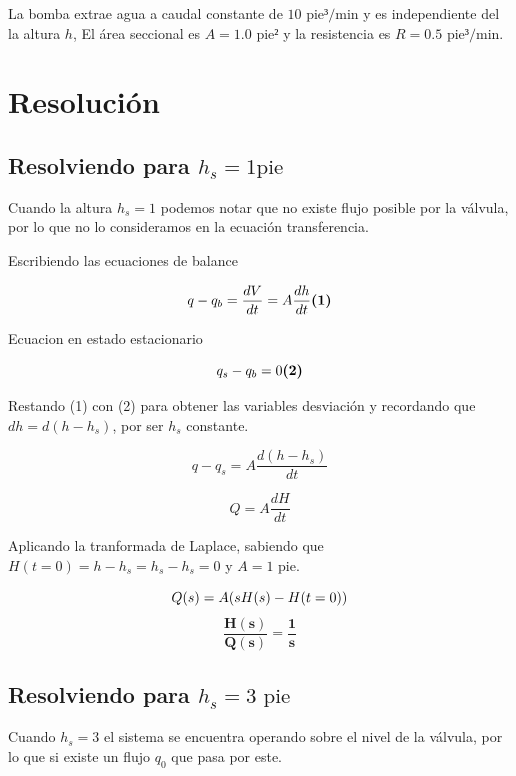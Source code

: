 \documentclass[
  letterpaper,
  DIV=11,
  numbers=noendperiod]{scrreprt}
\begin{document}
La bomba extrae agua a caudal constante de \(10\text{ pie³/min}\) y es
independiente del la altura \(h\), El área seccional es
\(A = 1.0\text{ pie²}\) y la resistencia es \(R=0.5\text{ pie³/min}\).

\hypertarget{resoluciuxf3n-1}{%
\section{Resolución}\label{resoluciuxf3n-1}}

\hypertarget{resolviendo-para-h_s1textpie}{%
\subsection{\texorpdfstring{Resolviendo para
\(h_s=1\text{pie}\)}{Resolviendo para h\_s=1\textbackslash text\{pie\}}}\label{resolviendo-para-h_s1textpie}}

Cuando la altura \(h_s=1\) podemos notar que no existe flujo posible por
la válvula, por lo que no lo consideramos en la ecuación transferencia.

Escribiendo las ecuaciones de balance

\[
q - q_b = \frac{dV}{dt} = A\frac{dh}{dt} \space\space\space\space\space \textbf{(1)}
\]

Ecuacion en estado estacionario

\[
q_s - q_b = 0 \space\space\space\space\space \textbf{(2)}
\]

Restando (1) con (2) para obtener las variables desviación y recordando
que \(dh=d(h-h_s)\), por ser \(h_s\) constante.

\[
q-q_s=A\frac{d(h-h_s)}{dt}
\]

\[
Q = A\frac{dH}{dt}
\]

Aplicando la tranformada de Laplace, sabiendo que
\(H(t=0)= h-h_s=h_s-h_s=0\) y \(A=1\text{ pie}\).

\[
Q(s)  = A(sH(s)-H(t=0))\\
\] \[
\mathbf{\frac{H(s)}{Q(s)}  = \frac{1}{s}}
\]

\hypertarget{resolviendo-para-h_s3text-pie}{%
\subsection{\texorpdfstring{Resolviendo para
\(h_s=3\text{ pie}\)}{Resolviendo para h\_s=3\textbackslash text\{ pie\}}}\label{resolviendo-para-h_s3text-pie}}

Cuando \(h_s=3\) el sistema se encuentra operando sobre el nivel de la
válvula, por lo que si existe un flujo \(q_0\) que pasa por este.
\end{document}
